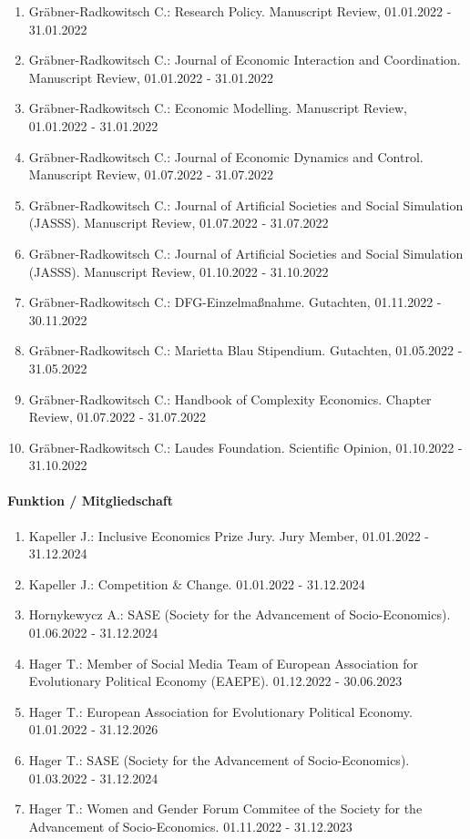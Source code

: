 \begin{enumerate}[leftmargin=*, labelsep=0.5cm]
\item Gräbner-Radkowitsch C.: Research Policy. Manuscript Review, 01.01.2022 - 31.01.2022
\item Gräbner-Radkowitsch C.: Journal of Economic Interaction and Coordination. Manuscript Review, 01.01.2022 - 31.01.2022
\item Gräbner-Radkowitsch C.: Economic Modelling. Manuscript Review, 01.01.2022 - 31.01.2022
\item Gräbner-Radkowitsch C.: Journal of Economic Dynamics and Control. Manuscript Review, 01.07.2022 - 31.07.2022
\item Gräbner-Radkowitsch C.: Journal of Artificial Societies and Social Simulation (JASSS). Manuscript Review, 01.07.2022 - 31.07.2022
\item Gräbner-Radkowitsch C.: Journal of Artificial Societies and Social Simulation (JASSS). Manuscript Review, 01.10.2022 - 31.10.2022
\item Gräbner-Radkowitsch C.: DFG-Einzelmaßnahme. Gutachten, 01.11.2022 - 30.11.2022
\item Gräbner-Radkowitsch C.: Marietta Blau Stipendium. Gutachten, 01.05.2022 - 31.05.2022
\item Gräbner-Radkowitsch C.: Handbook of Complexity Economics. Chapter Review, 01.07.2022 - 31.07.2022
\item Gräbner-Radkowitsch C.: Laudes Foundation. Scientific Opinion, 01.10.2022 - 31.10.2022
\end{enumerate}

\paragraph{Funktion / Mitgliedschaft}
\begin{enumerate}[leftmargin=*, labelsep=0.5cm]
\item Kapeller J.: Inclusive Economics Prize Jury. Jury Member, 01.01.2022 - 31.12.2024
\item Kapeller J.: Competition \& Change. 01.01.2022 - 31.12.2024
\item Hornykewycz A.: SASE (Society for the Advancement of Socio-Economics). 01.06.2022 - 31.12.2024
\item Hager T.: Member of Social Media Team of European Association for Evolutionary Political Economy (EAEPE). 01.12.2022 - 30.06.2023
\item Hager T.: European Association for Evolutionary Political Economy. 01.01.2022 - 31.12.2026
\item Hager T.: SASE (Society for the Advancement of Socio-Economics). 01.03.2022 - 31.12.2024
\item Hager T.: Women and Gender Forum Commitee of the Society for the Advancement of Socio-Economics. 01.11.2022 - 31.12.2023
\end{enumerate}
